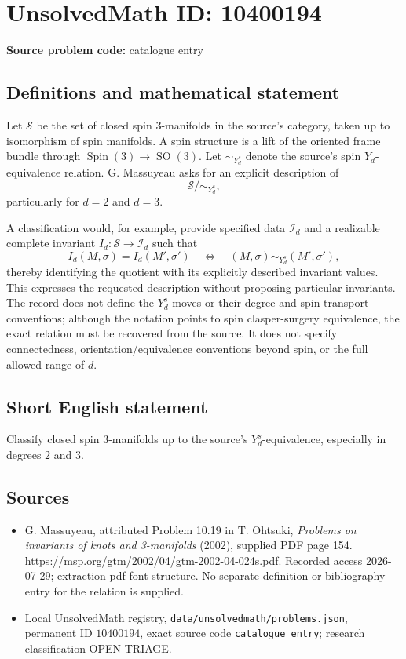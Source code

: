 \documentclass[11pt]{article}
\begin{document}
\section*{UnsolvedMath ID: 10400194}
\textbf{Source problem code:} catalogue entry
\subsection{Definitions and mathematical statement}
Let \(\mathcal S\) be the set of closed spin \(3\)-manifolds in the source's category, taken up to isomorphism of spin manifolds. A spin structure is a lift of the oriented frame bundle through \(\operatorname{Spin}(3)\to\operatorname{SO}(3)\). Let \(\sim_{Y_d^s}\) denote the source's spin \(Y_d\)-equivalence relation. G. Massuyeau asks for an explicit description of
\[
 \mathcal S/\!\sim_{Y_d^s},
\]
particularly for \(d=2\) and \(d=3\).

A classification would, for example, provide specified data \(\mathcal I_d\) and a realizable complete invariant \(I_d:\mathcal S\to\mathcal I_d\) such that
\[
 I_d(M,\sigma)=I_d(M',\sigma')
 \quad\Longleftrightarrow\quad
 (M,\sigma)\sim_{Y_d^s}(M',\sigma'),
\]
thereby identifying the quotient with its explicitly described invariant values. This expresses the requested description without proposing particular invariants. The record does not define the \(Y_d^s\) moves or their degree and spin-transport conventions; although the notation points to spin clasper-surgery equivalence, the exact relation must be recovered from the source. It does not specify connectedness, orientation/equivalence conventions beyond spin, or the full allowed range of \(d\).
\subsection{Short English statement}
Classify closed spin \(3\)-manifolds up to the source's \(Y_d^s\)-equivalence, especially in degrees \(2\) and \(3\).
\subsection{Sources}
\begin{itemize}
\item G. Massuyeau, attributed Problem 10.19 in T. Ohtsuki, \emph{Problems on invariants of knots and 3-manifolds} (2002), supplied PDF page 154. \url{https://msp.org/gtm/2002/04/gtm-2002-04-024s.pdf}. Recorded access 2026-07-29; extraction pdf-font-structure. No separate definition or bibliography entry for the relation is supplied.
\item Local UnsolvedMath registry, \texttt{data/unsolvedmath/problems.json}, permanent ID \(10400194\), exact source code \texttt{catalogue entry}; research classification OPEN-TRIAGE.
\end{itemize}
\end{document}
